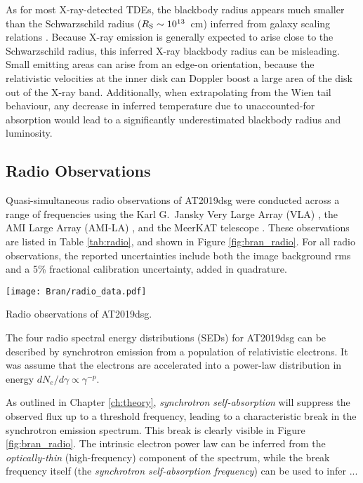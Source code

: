 As for most X-ray-detected TDEs, the blackbody radius appears much smaller than the Schwarzschild radius ($R_{\textup{S}} \sim 10^{13}$~cm) inferred from galaxy scaling relations .  Because X-ray emission is generally expected to arise close to the Schwarzschild radius, this inferred X-ray blackbody radius can be misleading. Small emitting areas can arise from an edge-on orientation, because the relativistic velocities at the inner disk can Doppler boost a large area of the disk out of the X-ray band.  Additionally, when extrapolating from the Wien tail behaviour, any decrease in inferred temperature due to unaccounted-for absorption would lead to a significantly underestimated blackbody radius and luminosity.

\subsection*{Radio Observations}

Quasi-simultaneous radio observations of AT2019dsg were conducted across a range of frequencies using the Karl G.\ Jansky Very Large Array (VLA) , the AMI Large Array (AMI-LA) , and the MeerKAT telescope . These observations are listed in Table \ref{tab:radio}, and shown in Figure \ref{fig:bran_radio}.  For all radio observations, the reported uncertainties include both the image background rms and a 5\% fractional calibration uncertainty, added in quadrature.

\begin{marginfigure}
	\texttt{[image: Bran/radio\_data.pdf]}
	\caption{Radio observations of AT2019dsg.}
	\label{fig:bran_radio}
\end{marginfigure}

The four radio spectral energy distributions (SEDs) for AT2019dsg can be described by synchrotron emission from a population of relativistic electrons. It was assume that the electrons are accelerated into a power-law distribution in energy $dN_{e}/d\gamma \propto \gamma^{-p}$. 

As outlined in Chapter \ref{ch:theory}, \emph{synchrotron self-absorption} will suppress the observed flux up to a threshold frequency, leading to a characteristic break in the synchrotron emission spectrum. This break is clearly visible in Figure \ref{fig:bran_radio}. The intrinsic electron power law can be inferred from the \emph{optically-thin} (high-frequency) component of the spectrum, while the break frequency itself (the \emph{synchrotron self-absorption frequency}) can be used to infer ...

